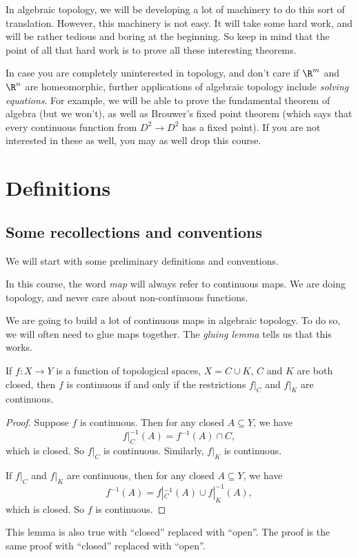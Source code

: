 \documentclass[a4paper]{article}
\begin{document}
In algebraic topology, we will be developing a lot of machinery to do this sort of translation. However, this machinery is not easy. It will take some hard work, and will be rather tedious and boring at the beginning. So keep in mind that the point of all that hard work is to prove all these interesting theorems.

In case you are completely uninterested in topology, and don't care if $\R^m$ and $\R^n$ are homeomorphic, further applications of algebraic topology include \emph{solving equations}. For example, we will be able to prove the fundamental theorem of algebra (but we won't), as well as Brouwer's fixed point theorem (which says that every continuous function from $D^2 \to D^2$ has a fixed point). If you are not interested in these as well, you may as well drop this course.

\section{Definitions}
\subsection{Some recollections and conventions}
We will start with some preliminary definitions and conventions.

\begin{defi}[Map]
  In this course, the word \emph{map} will always refer to continuous maps. We are doing topology, and never care about non-continuous functions.
\end{defi}

We are going to build a lot of continuous maps in algebraic topology. To do so, we will often need to glue maps together. The \emph{gluing lemma} tells us that this works.
\begin{lemma}
  If $f: X\to Y$ is a function of topological spaces, $X = C\cup K$, $C$ and $K$ are both closed, then $f$ is continuous if and only if the restrictions $f|_C$ and $f|_K$ are continuous.
\end{lemma}

\begin{proof}
  Suppose $f$ is continuous. Then for any closed $A \subseteq Y$, we have
  \[
    f|_C^{-1}(A) = f^{-1}(A) \cap C,
  \]
  which is closed. So $f|_C$ is continuous. Similarly, $f|_K$ is continuous.

  If $f|_C$ and $f|_K$ are continuous, then for any closed $A \subseteq Y$, we have
  \[
    f^{-1}(A) = f|_C^{-1}(A) \cup f|_K^{-1}(A),
  \]
  which is closed. So $f$ is continuous.
\end{proof}
This lemma is also true with ``closed'' replaced with ``open''. The proof is the same proof with ``closed'' replaced with ``open''.
\end{document}
